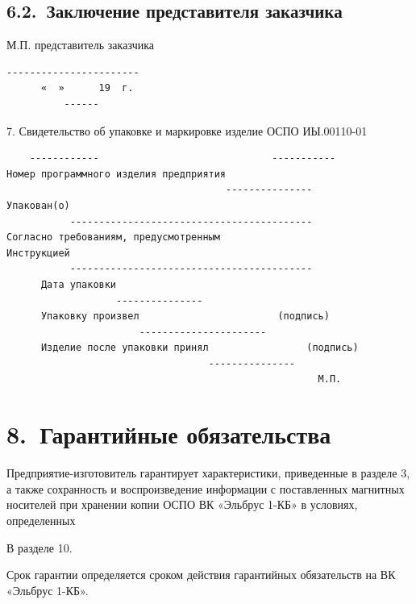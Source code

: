 \documentclass[11pt,a4paper]{article}
\begin{document}
\subsection*{6.2.~Заключение представителя заказчика}
\begin{center}М.П. представитель заказчика\end{center}
\begin{center}\small
\begin{BVerbatim}
-----------------------
      «  »      19  г.
          ------
\end{BVerbatim}
\end{center}

7. Свидетельство об упаковке и маркировке изделие ОСПО ИЫ.00110-01

\begin{center}\small
\begin{BVerbatim}
    ------------                              -----------
Номер программного изделия предприятия
                                      ---------------
Упакован(о)
           ------------------------------------------
Согласно требованиям, предусмотренным
Инструкцией
           ------------------------------------------
      Дата упаковки
                   ---------------
      Упаковку произвел                        (подпись)
                       ----------------------
      Изделие после упаковки принял                 (подпись)
                                   ---------------
                                                      М.П.
\end{BVerbatim}
\end{center}

\section*{8.~Гарантийные обязательства}
Предприятие-изготовитель гарантирует характеристики, приведенные в разделе 3, а также сохранность и воспроизведение информации с поставленных магнитных носителей при хранении копии ОСПО ВК «Эльбрус 1-КБ» в условиях, определенных

В разделе 10.

Срок гарантии определяется сроком действия гарантийных обязательств на ВК «Эльбрус 1-КБ».
\end{document}
